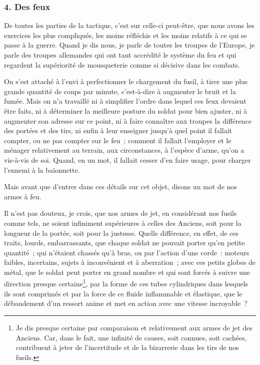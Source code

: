 \documentclass[french,twoside]{book} %
\begin{document}
\subsubsection[{4. Des feux}]{4. Des feux}
\noindent De toutes les parties de la tactique, c’est sur celle-ci peut-être, que nous avons les exercices les plus compliqués, les moins réfléchis et les moins relatifs à ce qui se passe à la guerre. Quand je dis nous, je parle de toutes les troupes de l’Europe, je parle des troupes allemandes qui ont tant accrédité le système du feu et qui regardent la supériorité de mousqueterie comme si décisive dans les combats.\par
On s’est attaché à l’envi à perfectionner le chargement du fusil, à tirer une plus grande quantité de coups par minute, c’est-à-dire à augmenter le bruit et la fumée. Mais on n’a travaillé ni à simplifier l’ordre dans lequel ces feux devaient être faits, ni à déterminer la meilleure posture du soldat pour bien ajuster, ni à augmenter son adresse sur ce point, ni à faire connaître aux troupes la différence des portées et des tirs, ni enfin à leur enseigner jusqu’à quel point il fallait compter, ou ne pas compter sur le feu ; comment il fallait l’employer et le ménager relativement au terrain, aux circonstances, à l’espèce d’arme, qu’on a vis-à-vis de soi. Quand, en un mot, il fallait cesser d’en faire usage, pour charger l’ennemi à la baïonnette.\par
Mais avant que d’entrer dans ces détails sur cet objet, disons un mot de nos armes à feu.\par
Il n’est pas douteux, je crois, que nos armes de jet, en considérant nos fusils comme tels, ne soient infiniment supérieures à celles des Anciens, soit pour la longueur de la portée, soit pour la justesse. Quelle différence, en effet, de ces traits, lourds, embarrassants, que chaque soldat ne pouvait porter qu’en petite quantité ; qui n’étaient chassés qu’à bras, ou par l’action d’une corde : moteurs faibles, incertains, sujets à inconvénient et à aberration ; avec ces petits globes de métal, que le soldat peut porter en grand nombre et qui sont forcés à suivre une direction presque certaine\footnote{Je dis presque certaine par comparaison et relativement aux armes de jet des Anciens. Car, dans le fait, une infinité de causes, soit connues, soit cachées, contribuent à jeter de l’incertitude et de la bizarrerie dans les tirs de nos fusils.}, par la forme de ces tubes cylindriques dans lesquels ils sont comprimés et par la force de ce fluide inflammable et élastique, que le débandement d’un ressort anime et met en action avec une vitesse incroyable ?\par
\end{document}
